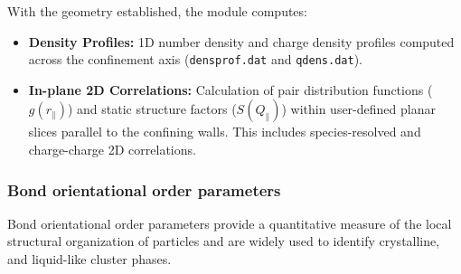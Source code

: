 \documentclass[final,1p,times]{elsarticle}
\begin{document}
With the geometry established, the module computes:
\begin{itemize}
    \item \textbf{Density Profiles:} 1D number density and charge density profiles computed across the confinement axis (\texttt{densprof.dat} and \texttt{qdens.dat}).
    \item \textbf{In-plane 2D Correlations:} Calculation of pair distribution functions ($g(r_\parallel)$) and static structure factors ($S(Q_\parallel)$) within user-defined planar slices parallel to the confining walls. This includes species-resolved and charge-charge 2D correlations.
\end{itemize}


\subsubsection{Bond orientational order parameters}

Bond orientational order parameters provide a quantitative measure of
the local structural organization of particles\cite{Steinhard1983} and
are widely used to identify crystalline, and  liquid-like cluster phases.
\end{document}
